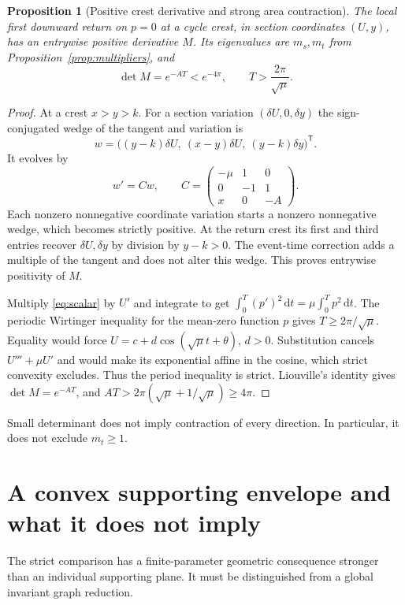 \documentclass[11pt,a4paper]{article}
\numberwithin{equation}{section}
\newtheorem{proposition}[theorem]{Proposition}
\theoremstyle{remark}\newtheorem{remark}[theorem]{Remark}
\newcommand{\dd}{\,\mathrm dt}
\begin{document}
\begin{proposition}[Positive crest derivative and strong area contraction]\label{prop:crestmap}
The local first downward return on $p=0$ at a cycle crest, in section coordinates $(U,y)$, has an entrywise positive derivative $M$. Its eigenvalues are $m_s,m_t$ from Proposition~\ref{prop:multipliers}, and
\begin{equation}\label{eq:determinant}
\det M=e^{-AT}<e^{-4\pi},\qquad T>\frac{2\pi}{\sqrt\mu}.
\end{equation}
\end{proposition}
\begin{proof}
At a crest $x>y>k$. For a section variation $(\delta U,0,\delta y)$ the sign-conjugated wedge of the tangent and variation is
\[
w=\bigl((y-k)\delta U,\ (x-y)\delta U,\ (y-k)\delta y\bigr)^{\mathsf T}.
\]
It evolves by
\begin{equation}\label{eq:compound}
w'=Cw,\qquad C=\begin{pmatrix}-\mu&1&0\\0&-1&1\\x&0&-A\end{pmatrix}.
\end{equation}
Each nonzero nonnegative coordinate variation starts a nonzero nonnegative wedge, which becomes strictly positive. At the return crest its first and third entries recover $\delta U,\delta y$ by division by $y-k>0$. The event-time correction adds a multiple of the tangent and does not alter this wedge. This proves entrywise positivity of $M$.

Multiply \eqref{eq:scalar} by $U'$ and integrate to get $\int_0^T(p')^2\dd=\mu\int_0^T p^2\dd$. The periodic Wirtinger inequality for the mean-zero function $p$ gives $T\ge2\pi/\sqrt\mu$. Equality would force $U=c+d\cos(\sqrt\mu t+\theta)$, $d>0$. Substitution cancels $U'''+\mu U'$ and would make its exponential affine in the cosine, which strict convexity excludes. Thus the period inequality is strict. Liouville's identity gives $\det M=e^{-AT}$, and $AT>2\pi(\sqrt\mu+1/\sqrt\mu)\ge4\pi$.
\end{proof}
Small determinant does not imply contraction of every direction. In particular, it does not exclude $m_t\ge1$.

\section{A convex supporting envelope and what it does not imply}\label{sec:envelope}
The strict comparison has a finite-parameter geometric consequence stronger than an individual supporting plane. It must be distinguished from a global invariant graph reduction.
\end{document}

